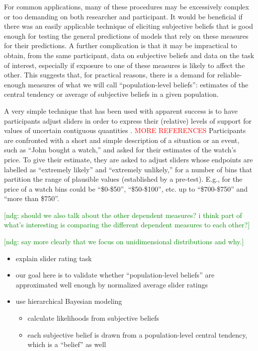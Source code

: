\documentclass[10pt,letterpaper]{article}
\newcommand{\ndg}[1]{\textcolor{Green}{[ndg: #1]}}
\newcommand{\citep}[1]{\cite{#1}}
\begin{document}
For common applications, many of these procedures may be excessively complex or too demanding
on both researcher and participant. It would be beneficial if there was an easily applicable
technique of eliciting subjective beliefs that is good enough for testing the general
predictions of models that rely on these measures for their predictions. A further complication
is that it may be impractical to obtain, from the same participant, data on subjective beliefs
and data on the task of interest, especially if exposure to one of these measures is likely to
affect the other. This suggests that, for practical reasons, there is a demand for
reliable-enough measures of what we will  call ``population-level beliefs'': estimates
of the central tendency or average of subjective beliefs in a given population.

A very simple technique that has been used with apparent success is to have participants adjust
sliders in order to express their (relative) levels of support for values of uncertain
contiguous quantities
\citep{KaoWu2014:Nonliteral-Unde,SchollerFranke2015:Semantic-values}. \textcolor{red}{ MORE REFERENCES } Participants are confronted with a short and simple description of a situation or an
event, such as ``John bought a watch,'' and asked for their estimates of the watch's price. To
give their estimate, they are asked to adjust sliders whose endpoints are labelled as ``extremely
likely'' and ``extremely unlikely,'' for a number of bins that partition the range of plausible
values (established by a pre-test). E.g., for the price of a watch bins could be ``\$0-\$50'',
``\$50-\$100'', etc. up to ``\$700-\$750'' and ``more than \$750''.

\ndg{should we also talk about the other dependent measures? i think part of what's interesting is comparing the different dependent measures to each other?}

\ndg{say more clearly that we focus on unidimensional distributions and why.}

\begin{itemize}
\item explain slider rating task
\item our goal here is to validate whether ``population-level beliefs'' are approximated well
  enough by normalized average slider ratings
\item use hierarchical Bayesian modeling
  \begin{itemize}
  \item calculate likelihoods from subjective beliefs
  \item each subjective belief is drawn from a population-level central tendency, which is a
    ``belief'' as well
  \end{itemize}
\end{itemize}
\end{document}
